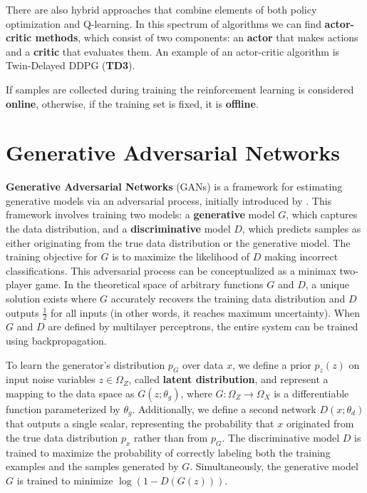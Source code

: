 There are also hybrid approaches that combine elements
of both policy optimization and Q-learning.
In this spectrum of algorithms we can find 
\textbf{actor-critic methods}, which consist of two components:
an \textbf{actor} that makes actions and a \textbf{critic} that evaluates them.
An example of an actor-critic algorithm is Twin-Delayed DDPG (\textbf{TD3}).

If samples are collected during training the reinforcement learning is
considered \textbf{online}, otherwise,
if the training set is fixed, it is \textbf{offline}.

\section{Generative Adversarial Networks}

\textbf{Generative Adversarial Networks} (GANs) is a framework
for estimating generative models via an adversarial process,
initially introduced by \cite{goodfellow2014}.
This framework involves training two models:
a \textbf{generative} model \( G \), which captures the data
distribution, and a \textbf{discriminative} model \( D \),
which predicts samples as either originating from the true
data distribution or the generative model.
The training objective for \( G \) is to maximize
the likelihood of \( D \) making incorrect classifications.
This adversarial process can be conceptualized as a minimax two-player game.
In the theoretical space of arbitrary functions \( G \) and \( D \),
a unique solution exists where \( G \) accurately
recovers the training data distribution and \( D \) outputs $\frac{1}{2}$
for all inputs (in other words, it reaches maximum uncertainty).
When \( G \) and \( D \) are defined by multilayer perceptrons,
the entire system can be trained using backpropagation.

To learn the generator's distribution \( p_G \)
over data \( x \), we define a prior \( p_z(z) \) on input noise variables
$z \in \Omega_Z$, called \textbf{latent distribution},
and represent a mapping to the data space as
\( G(z; \theta_g) \), where \( G: \Omega_Z \rightarrow \Omega_X \)
is a differentiable function parameterized by \( \theta_g \).
Additionally, we define a second network
\( D(x; \theta_d) \) that outputs a single scalar,
representing the probability that \( x \) originated
from the true data distribution $p_x$ rather than from \( p_G \).
The discriminative model \( D \) is trained to maximize
the probability of correctly labeling both the training
examples and the samples generated by \( G \).
Simultaneously, the generative model \( G \) is trained to minimize
\( \log(1 - D(G(z))) \).

